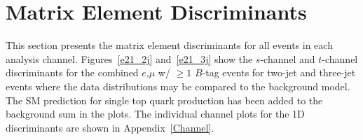 \clearpage
\section{Matrix Element Discriminants}
\label{matrixelementresults}

This section presents the matrix element discriminants for all events in each analysis channel. Figures~\ref{e21_2j} and~\ref{e21_3j} show the $s$-channel and $t$-channel
discriminants for the combined $e$,$\mu$ w/ $\geq1$ $B$-tag events for two-jet
and three-jet events where the data distributions may be compared to
the background model.  The SM prediction for single top quark
production has been added to the background sum in the plots. The
individual channel plots for the 1D discriminants are shown in
Appendix~\ref{Channel}.

\vspace{-0.05in}
